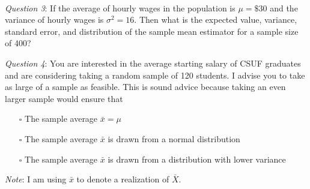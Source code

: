 \documentclass{./../../Latex/handout}
\begin{document}
\newpage
{} \\

\textit{Question 3}: If the average of hourly wages in the population is \( \mu = \$30 \) and the variance of hourly wages is \( \sigma^2 = 16 \). Then what is the expected value, variance, standard error, and distribution of the sample mean estimator for a sample size of 400? \\ \vspace{2cm}

\textit{Question 4}: You are interested in the average starting salary of CSUF graduates and are considering taking a random sample of 120 students. I advise you to take as large of a sample as feasible. This is sound advice because taking an even larger sample would ensure that \vspace{-1em}
\begin{itemize}
\item[$\square$] The sample average $\bar{x}=\mu$
\item[$\square$] The sample average $\bar{x}$ is drawn from a normal distribution
\item[$\square$] The sample average $\bar{x}$ is drawn from a distribution with lower variance 
\end{itemize}
\textit{Note}: I am using $\bar{x}$ to denote a realization of $\bar{X}$. \\
\end{document}
